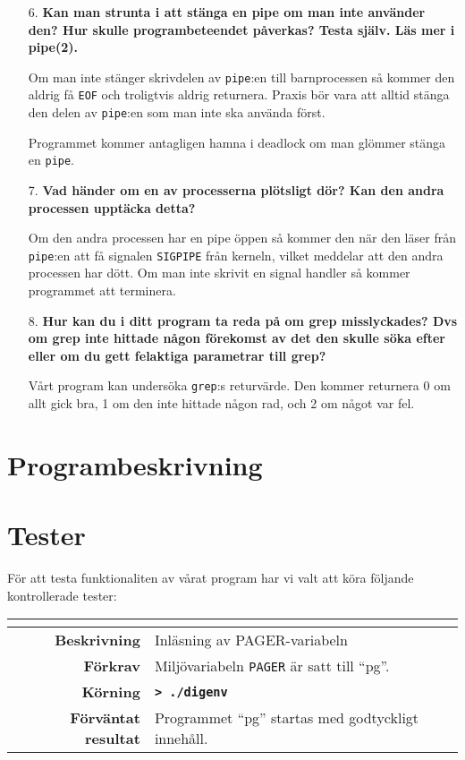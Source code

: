 \documentclass[a4paper,10pt]{article}
\newcommand{\cmdline}[1]{\mbox{\textbf{\texttt{> #1}}}}
\begin{document}
\begin{enumerate}
	\item[6.] \textbf{\footnotesize Kan man strunta i att stänga en pipe om man inte använder den? Hur skulle programbeteendet påverkas? Testa själv. Läs mer i pipe(2).}

	Om man inte stänger skrivdelen av \verb!pipe!:en till barnprocessen så kommer den aldrig få \verb!EOF! och troligtvis aldrig returnera. Praxis bör vara att alltid stänga den delen av \verb!pipe!:en som man inte ska använda först.

	Programmet kommer antagligen hamna i deadlock om man glömmer stänga en \verb!pipe!.

	\item[7.] \textbf{\footnotesize Vad händer om en av processerna plötsligt dör? Kan den andra processen upptäcka detta?}

	Om den andra processen har en pipe öppen så kommer den när den läser från \verb!pipe!:en att få signalen \verb!SIGPIPE! från kerneln, vilket meddelar att den andra processen har dött. Om man inte skrivit en signal handler så kommer programmet att terminera.

	\item[8.] \textbf{\footnotesize Hur kan du i ditt program ta reda på om grep misslyckades? Dvs om grep inte hittade någon förekomst av det den skulle söka efter eller om du gett felaktiga parametrar till grep?}

	Vårt program kan undersöka \verb!grep!:s returvärde. Den kommer returnera 0 om allt gick bra, 1 om den inte hittade någon rad, och 2 om något var fel.	
\end{enumerate}

\section{Programbeskrivning}

\newpage
\section{Tester}

För att testa funktionaliten av vårat program har vi valt att köra följande kontrollerade tester:

\begin{table}[H]
	\begin{tabularx}{\textwidth}{>{\bfseries}r  X }
		\multicolumn{2}{c}{\large\textbf{Testfall 1}} \\[0.1cm]
		\toprule	Beskrivning				& Inläsning av PAGER-variabeln \\
		\midrule	Förkrav					& Miljövariabeln \texttt{PAGER} är satt till ``pg''. \\
		\midrule	Körning					& \cmdline{./digenv} \\
		\midrule	Förväntat resultat		& Programmet ``pg'' startas med godtyckligt innehåll. \\
		\bottomrule
	\end{tabularx}
\end{table}
\end{document}
